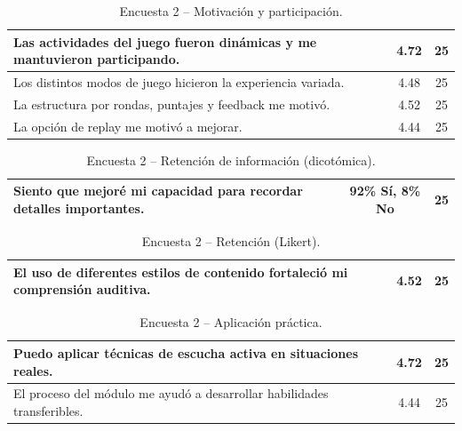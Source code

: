 \begin{table}[H]
\centering
\footnotesize
\setlength{\tabcolsep}{4pt}
\renewcommand{\arraystretch}{1.35}
\begin{tabular}{|p{10.5cm}|c|c|}
\hline
Las actividades del juego fueron dinámicas y me mantuvieron participando. & 4.72 & 25 \\
\hline
Los distintos modos de juego hicieron la experiencia variada. & 4.48 & 25 \\
\hline
La estructura por rondas, puntajes y feedback me motivó. & 4.52 & 25 \\
\hline
La opción de replay me motivó a mejorar. & 4.44 & 25 \\
\hline
\end{tabular}
\caption{Encuesta 2 – Motivación y participación.}
\label{tab:anexo-ea-motivacion}
\end{table}

\begin{table}[H]
\centering
\footnotesize
\setlength{\tabcolsep}{4pt}
\renewcommand{\arraystretch}{1.35}
\begin{tabular}{|p{10.5cm}|c|c|}
\hline
Siento que mejoré mi capacidad para recordar detalles importantes. & 92\% Sí, 8\% No & 25 \\
\hline
\end{tabular}
\caption{Encuesta 2 – Retención de información (dicotómica).}
\label{tab:anexo-ea-retencion-dicotomica}
\end{table}

\begin{table}[H]
\centering
\footnotesize
\setlength{\tabcolsep}{4pt}
\renewcommand{\arraystretch}{1.35}
\begin{tabular}{|p{10.5cm}|c|c|}
\hline
El uso de diferentes estilos de contenido fortaleció mi comprensión auditiva. & 4.52 & 25 \\
\hline
\end{tabular}
\caption{Encuesta 2 – Retención (Likert).}
\label{tab:anexo-ea-retencion-likert}
\end{table}

\begin{table}[H]
\centering
\footnotesize
\setlength{\tabcolsep}{4pt}
\renewcommand{\arraystretch}{1.35}
\begin{tabular}{|p{10.5cm}|c|c|}
\hline
Puedo aplicar técnicas de escucha activa en situaciones reales. & 4.72 & 25 \\
\hline
El proceso del módulo me ayudó a desarrollar habilidades transferibles. & 4.44 & 25 \\
\hline
\end{tabular}
\caption{Encuesta 2 – Aplicación práctica.}
\label{tab:anexo-ea-aplicacion}
\end{table}

